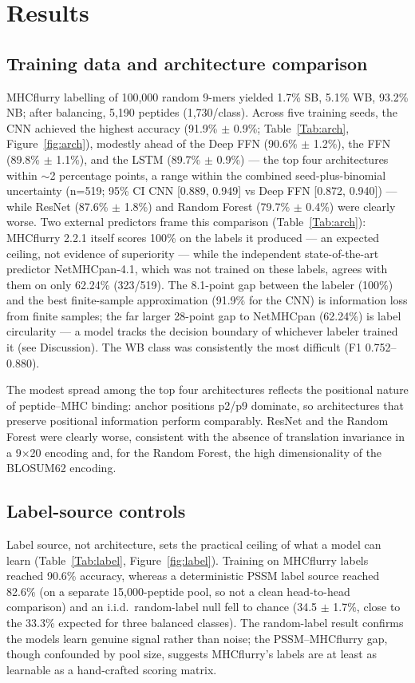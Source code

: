 \section{Results}\label{sec:results}

\subsection{Training data and architecture comparison}
MHCflurry labelling of 100,000 random 9-mers yielded 1.7\% SB, 5.1\% WB, 93.2\% NB; after balancing, 5,190 peptides (1,730/class). Across five training seeds, the CNN achieved the highest accuracy (91.9\% $\pm$ 0.9\%; Table~\ref{Tab:arch}, Figure~\ref{fig:arch}), modestly ahead of the Deep FFN (90.6\% $\pm$ 1.2\%), the FFN (89.8\% $\pm$ 1.1\%), and the LSTM (89.7\% $\pm$ 0.9\%) --- the top four architectures within $\sim$2 percentage points, a range within the combined seed-plus-binomial uncertainty (n=519; 95\% CI CNN [0.889, 0.949] vs Deep FFN [0.872, 0.940]) --- while ResNet (87.6\% $\pm$ 1.8\%) and Random Forest (79.7\% $\pm$ 0.4\%) were clearly worse. Two external predictors frame this comparison (Table~\ref{Tab:arch}): MHCflurry 2.2.1 itself scores 100\% on the labels it produced --- an expected ceiling, not evidence of superiority --- while the independent state-of-the-art predictor NetMHCpan-4.1, which was not trained on these labels, agrees with them on only 62.24\% (323/519). The 8.1-point gap between the labeler (100\%) and the best finite-sample approximation (91.9\% for the CNN) is information loss from finite samples; the far larger 28-point gap to NetMHCpan (62.24\%) is label circularity --- a model tracks the decision boundary of whichever labeler trained it (see Discussion). The WB class was consistently the most difficult (F1 0.752--0.880).

The modest spread among the top four architectures reflects the positional nature of peptide--MHC binding: anchor positions p2/p9 dominate, so architectures that preserve positional information perform comparably. ResNet and the Random Forest were clearly worse, consistent with the absence of translation invariance in a 9$\times$20 encoding and, for the Random Forest, the high dimensionality of the BLOSUM62 encoding.

\subsection{Label-source controls}
Label source, not architecture, sets the practical ceiling of what a model can learn (Table~\ref{Tab:label}, Figure~\ref{fig:label}). Training on MHCflurry labels reached 90.6\% accuracy, whereas a deterministic PSSM label source reached 82.6\% (on a separate 15,000-peptide pool, so not a clean head-to-head comparison) and an i.i.d.\ random-label null fell to chance (34.5 $\pm$ 1.7\%, close to the 33.3\% expected for three balanced classes). The random-label result confirms the models learn genuine signal rather than noise; the PSSM--MHCflurry gap, though confounded by pool size, suggests MHCflurry's labels are at least as learnable as a hand-crafted scoring matrix.

